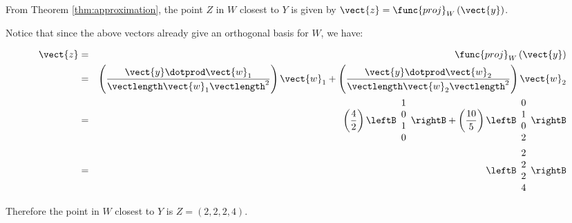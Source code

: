 \begin{solution}
From Theorem \ref{thm:approximation}, the point $Z$ in $W$ closest to
$Y$ is given by $\vect{z} = \func{proj}_{W}\left( \vect{y}\right)$.

Notice that since the above vectors already give an orthogonal basis for $W$, we have:

\begin{eqnarray*}
\vect{z} &=& \func{proj}_{W}\left( \vect{y}\right)\\
&=&
\left( \frac{\vect{y} \dotprod \vect{w}_1}{ \vectlength \vect{w}_1 \vectlength^2}\right) \vect{w}_1
+
\left( \frac{\vect{y} \dotprod \vect{w}_2}{ \vectlength \vect{w}_2 \vectlength^2}\right) \vect{w}_2 \\
&=& 
\left( \frac{4}{2} \right) \leftB
\begin{array}{c}
1 \\
0 \\
1 \\
0 
\end{array}
\rightB
+
\left( \frac{10}{5} \right)
\leftB
\begin{array}{c}
0 \\
1 \\
0 \\
2
\end{array}
\rightB \\
&=& 
\leftB
\begin{array}{c}
2 \\
2 \\
2 \\
4 
\end{array}
\rightB
\end{eqnarray*} 

Therefore the point in $W$ closest to $Y$ is $Z = (2,2,2,4)$. \\


\end{solution}
